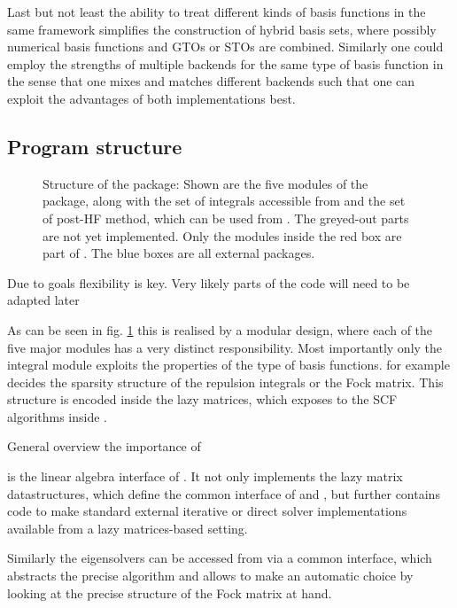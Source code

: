 Last but not least the ability to treat different kinds of basis functions
in the same framework simplifies the construction of hybrid basis sets,
where possibly numerical basis functions and GTOs or STOs are combined.
Similarly one could employ the strengths of multiple backends for the same type of basis function
in the sense that one mixes and matches different backends such that one can exploit
the advantages of both implementations best.





\subsection{Program structure}
\begin{figure}
	\centering
	\caption{Structure of the \molsturm package: Shown are the five modules of the package,
	along with the set of integrals accessible from \gint and the set of post-HF method,
	which can be used from \molsturm. The greyed-out parts are not yet implemented.
	Only the modules inside the red box are part of \molsturm. The blue boxes are all external packages.}
	\label{fig:structureMolsturm}
\end{figure}

Due to goals flexibility is key.
Very likely parts of the code will need to be adapted later



As can be seen in fig. \ref{fig:structureMolsturm} this is realised
by a modular design,
where each of the five major modules has a very
distinct responsibility.
Most importantly only the integral module \gint
exploits the properties of the type of basis functions.
\gint for example decides the sparsity structure of the
repulsion integrals or the Fock matrix.
This structure is encoded inside the lazy matrices,
which \gint exposes to the SCF algorithms inside \gscf.




General overview the importance of \lazyten

\lazyten is the linear algebra interface of \molsturm.
It not only implements the lazy matrix datastructures,
which define the common interface of \gint and \gscf,
but further contains code to make standard external
iterative or direct solver implementations available
from a lazy matrices-based setting.

Similarly the eigensolvers can be accessed from \gscf via a common interface,
which abstracts the precise algorithm and allows \lazyten to make an automatic
choice by looking at the precise structure of the Fock matrix at hand.


